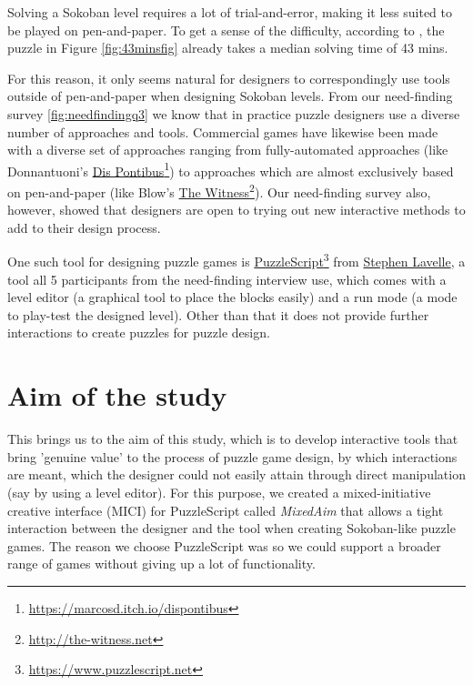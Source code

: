 Solving a Sokoban level requires a lot of trial-and-error, making it less suited to be played on pen-and-paper. To get a sense of the difficulty, according to \cite{Pelanek2011}, the puzzle in Figure \ref{fig:43minsfig} already takes a median solving time of 43 mins.

For this reason, it only seems natural for designers to correspondingly use tools outside of pen-and-paper when designing Sokoban levels.  
From our need-finding survey \ref{fig:needfindingq3} we know that in practice puzzle designers use a diverse number of approaches and tools. Commercial games have likewise been made with a diverse set of approaches ranging from fully-automated approaches (like Donnantuoni's \href{https://marcosd.itch.io/dispontibus}{Dis Pontibus}\footnote{\url{https://marcosd.itch.io/dispontibus}}) to approaches which are almost exclusively based on pen-and-paper (like Blow's \href{http://the-witness.net}{\url{The Witness}}\footnote{\url{http://the-witness.net}}). Our need-finding survey also, however, showed that designers are open to trying out new interactive methods to add to their design process.

One such tool for designing puzzle games is \href{https://www.puzzlescript.net}{PuzzleScript}\footnote{\url{https://www.puzzlescript.net}} from \href{https://www.increpare.com}{Stephen Lavelle}, a tool all 5 participants from the need-finding interview use, which comes with a level editor (a graphical tool to place the blocks easily) and a run mode (a mode to play-test the designed level). Other than that it does not provide further interactions to create puzzles for puzzle design.


\section{Aim of the study}

This brings us to the aim of this study, which is to develop interactive tools that bring 'genuine value' to the process of puzzle game design, by which interactions are meant, which the designer could not easily attain through direct manipulation (say by using a level editor). For this purpose, we created a mixed-initiative creative interface (MICI) for PuzzleScript called \textit{MixedAim} that allows a tight interaction between the designer and the tool when creating Sokoban-like puzzle games. The reason we choose PuzzleScript was so we could support a broader range of games without giving up a lot of functionality.

